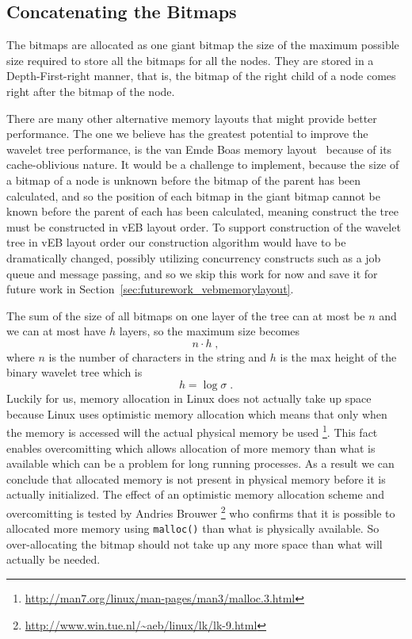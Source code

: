 \subsection{Concatenating the Bitmaps}
The bitmaps are allocated as one giant bitmap the size of the maximum possible size required to store all the bitmaps for all the nodes.
They are stored in a Depth-First-right manner, that is, the bitmap of the right child of a node comes right after the bitmap of the node.

There are many other alternative memory layouts that might provide better performance.
The one we believe has the greatest potential to improve the wavelet tree performance, is the van Emde Boas memory layout~ because of its cache-oblivious nature.
It would be a challenge to implement, because the size of a bitmap of a node is unknown before the bitmap of the parent has been calculated, and so the position of each bitmap in the giant bitmap cannot be known before the parent of each has been calculated, meaning construct the tree must be constructed in vEB layout order.
To support construction of the wavelet tree in vEB layout order our construction algorithm would have to be dramatically changed, possibly utilizing concurrency constructs such as a job queue and message passing, and so we skip this work for now and save it for future work in Section~\ref{sec:futurework_vebmemorylayout}.

The sum of the size of all bitmaps on one layer of the tree can at most be $n$ and we can at most have $h$ layers, so the maximum size becomes
\[n \cdot h\;,\]
where $n$ is the number of characters in the string and $h$ is the max height of the binary wavelet tree which is
\[ h = \log\sigma\;.\]
Luckily for us, memory allocation in Linux does not actually take up space because Linux uses optimistic memory allocation which means that only when the memory is accessed will the actual physical memory be used \footnote{\url{http://man7.org/linux/man-pages/man3/malloc.3.html}}.
This fact enables overcomitting which allows allocation of more memory than what is available which can be a problem for long running processes.
As a result we can conclude that allocated memory is not present in physical memory before it is actually initialized.
The effect of an optimistic memory allocation scheme and overcomitting is tested by Andries Brouwer \footnote{\url{http://www.win.tue.nl/~aeb/linux/lk/lk-9.html}} who confirms that it is possible to allocated more memory using \texttt{malloc()} than what is physically available.
So over-allocating the bitmap should not take up any more space than what will actually be needed.

